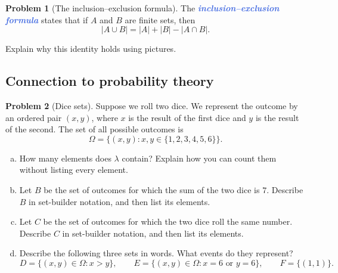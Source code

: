 \documentclass[10pt]{amsart}
\theoremstyle{definition}
\newtheorem{problem}{Problem}
\newcommand{\demph}[1]{\textcolor{RoyalBlue}{\textbf{\textit{#1}}}}
\begin{document}
\begin{problem}[The inclusion--exclusion formula]
  The \demph{inclusion--exclusion formula} states that if $A$ and $B$ are
  finite sets, then
  \begin{equation*}
    |A\cup B|=|A|+|B|-|A\cap B|.
  \end{equation*}

  Explain why this identity holds using pictures.

  \vspace{3in}
\end{problem}

\subsection{Connection to probability theory}

\begin{problem}[Dice sets]
  Suppose we roll two dice. We represent the outcome by an ordered pair
  $(x,y)$, where $x$ is the result of the first dice and $y$ is the result of
  the second. The set of all possible outcomes is
  \begin{equation*}
    \Omega=\{(x,y):x,y\in\{1,2,3,4,5,6\}\}.
  \end{equation*}

  \begin{enumerate}[(a)]
    \item How many elements does $\lambda$ contain? Explain how you can count
    them without listing every element.
    \vspace{.9in}

    \item Let $B$ be the set of outcomes for which the sum of the two dice is $7$.
    Describe $B$ in set-builder notation, and then list its elements.
    \vspace{.9in}

    \item Let $C$ be the set of outcomes for which the two dice roll the same
    number. Describe $C$ in set-builder notation, and then list its elements.
    \vspace{.9in}

    \item Describe the following three sets in words. What events do they represent?
    \begin{equation*}
      D=\{(x,y)\in\Omega:x>y\},
      \qquad
      E=\{(x,y)\in\Omega:x=6\text{ or }y=6\},
      \qquad
      F=\{(1,1)\}.
    \end{equation*}
    \vspace{1.3in}


\end{enumerate}
\end{problem}
\end{document}
